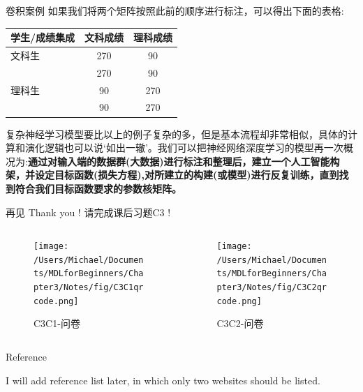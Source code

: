 \documentclass[handout]{beamer}
\begin{document}
\begin{frame}{卷积案例}
如果我们将两个矩阵按照此前的顺序进行标注，可以得出下面的表格:
\begin{table}[H]
\renewcommand{\arraystretch}{1.2}
	\centering
	\begin{tabular}{|l|cc|}
	\hline 
		学生/成绩集成 & 文科成绩 & 理科成绩 \\
		\hline 
		文科生& 270 & 90 \\
		& 270 & 90 \\
		\hline 
		理科生& 90 & 270 \\
		& 90 & 270 \\
		\hline 
	\end{tabular}
\end{table}
{\footnotesize
复杂神经学习模型要比以上的例子复杂的多，但是基本流程却非常相似，具体的计算和演化逻辑也可以说`如出一辙'。我们可以把神经网络深度学习的模型再一次概况为:\textbf{通过对输入端的数据群(大数据)进行标注和整理后，建立一个人工智能构架，并设定目标函数(损失方程),对所建立的构建(或模型)进行反复训练，直到找到符合我们目标函数要求的参数核矩阵。}
}
\end{frame}


\begin{frame}{再见}
	Thank you !  请完成课后习题C3 !
\begin{columns}
	\begin{column}{0.4\textwidth}
			\begin{figure}[H]
				\centering
			\texttt{[image: /Users/Michael/Documents/MDLforBeginners/Chapter3/Notes/fig/C3C1qrcode.png]}
			\caption{C3C1-问卷}
			\end{figure}
	\end{column}
	\begin{column}{0.4\textwidth}
		\begin{figure}[H]
	\texttt{[image: /Users/Michael/Documents/MDLforBeginners/Chapter3/Notes/fig/C3C2qrcode.png]}
	\caption{C3C2-问卷}
\end{figure}	
	\end{column}
\end{columns}
\end{frame}




\begin{frame}[allowframebreaks]{Reference}
  
  
  I will add reference list later, in which only two websites should be listed. 
\end{frame}
\end{document}
